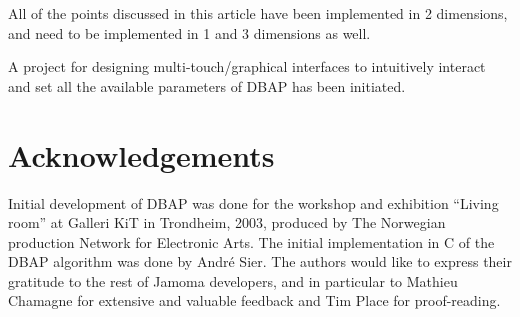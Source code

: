 \documentclass[twoside,10pt]{article}
\begin{document}

All of the points discussed in this article have been implemented in 2 dimensions, and need to be implemented in 1 and 3 dimensions as well.  

A project for designing multi-touch/graphical interfaces to intuitively interact and set all the available parameters of DBAP has been initiated.


\section{Acknowledgements}

Initial development of DBAP was done for the workshop and exhibition ``Living room'' at Galleri KiT in Trondheim, 2003, produced by The Norwegian production Network for Electronic Arts. The initial implementation in C of the DBAP algorithm was done by André Sier. The authors would like to express their gratitude to the rest of Jamoma developers, and in particular to Mathieu Chamagne for extensive and valuable feedback and Tim Place for proof-reading. 




\end{document}
